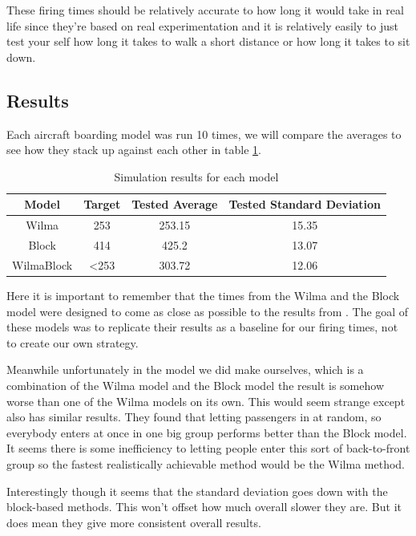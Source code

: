 \documentclass[english]{article}
\begin{document}
These firing times should be relatively accurate to how long it would take in real life since they're based on real experimentation and it is relatively easily to just test your self how long it takes to walk a short distance or how long it takes to sit down. 


\subsection{Results}
Each aircraft boarding model was run 10 times, we will compare the averages to see how they stack up against each other in table \ref{tab:results_all}.

\begin{table}[H]
    \centering
\begin{tabular}{|c|c|c|c|}
    \hline
    Model & Target & Tested Average & Tested Standard Deviation \\
    \hline
    Wilma & 253 & 253.15 & 15.35\\
    \hline
    Block & 414 & 425.2 & 13.07 \\
    \hline
    WilmaBlock & <253 & 303.72 & 12.06 \\
    \hline
\end{tabular}
    \caption{Simulation results for each model}
    \label{tab:results_all}
\end{table}

Here it is important to remember that the times from the Wilma and the Block model were designed to come as close as possible to the results from \cite{STEFFEN201264}. The goal of these models was to replicate their results as a baseline for our firing times, not to create our own strategy. 

Meanwhile unfortunately in the model we did make ourselves, which is a combination of the Wilma model and the Block model the result is somehow worse than one of the Wilma models on its own. This would seem strange except  also has similar results. They found that letting passengers in at random, so everybody enters at once in one big group performs better than the Block model. It seems there is some inefficiency to letting people enter this sort of back-to-front group so the fastest realistically achievable method would be the Wilma method. 

Interestingly though it seems that the standard deviation goes down with the block-based methods. This won't offset how much overall slower they are. But it does mean they give more consistent overall results.
\end{document}
